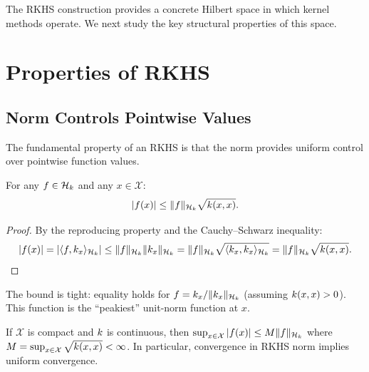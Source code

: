 \documentclass[11pt,a4paper]{article}
\begin{document}
The RKHS construction provides a concrete Hilbert space in which
kernel methods operate. We next study the key structural properties
of this space.


\section{Properties of RKHS}
\label{sec:rkhs-properties}

\subsection{Norm Controls Pointwise Values}

The fundamental property of an RKHS is that the norm provides
uniform control over pointwise function values.

\begin{theorem}
\label{thm:pointwise-bound}
For any $f \in \mathcal{H}_k$ and any $x \in \mathcal{X}$:
\begin{equation}
\label{eq:pointwise-bound}
|f(x)| \le \|f\|_{\mathcal{H}_k} \sqrt{k(x, x)}.
\end{equation}
\end{theorem}

\begin{proof}
By the reproducing property and the Cauchy--Schwarz inequality:
\[
|f(x)| = |\langle f, k_x \rangle_{\mathcal{H}_k}|
\le \|f\|_{\mathcal{H}_k} \|k_x\|_{\mathcal{H}_k}
= \|f\|_{\mathcal{H}_k} \sqrt{\langle k_x, k_x
\rangle_{\mathcal{H}_k}} = \|f\|_{\mathcal{H}_k} \sqrt{k(x, x)}.
\]
\end{proof}

\begin{remark}
\label{rem:pointwise-tight}
The bound is tight: equality holds for $f = k_x / \|k_x
\|_{\mathcal{H}_k}$ (assuming $k(x, x) > 0$). This function is the
``peakiest'' unit-norm function at $x$.
\end{remark}

\begin{corollary}
\label{cor:uniform-pointwise}
If $\mathcal{X}$ is compact and $k$ is continuous, then
$\sup_{x \in \mathcal{X}} |f(x)| \le M \|f\|_{\mathcal{H}_k}$ where
$M = \sup_{x \in \mathcal{X}} \sqrt{k(x, x)} < \infty$.
In particular, convergence in RKHS norm implies uniform convergence.
\end{corollary}
\end{document}
